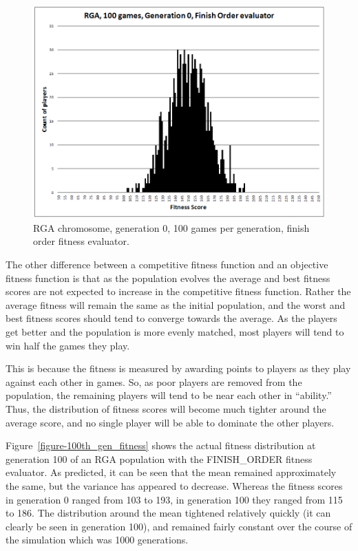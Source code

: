 \begin{figure}[htp]
\centerline{\includegraphics[width=1.0\columnwidth]{Figures/RGA_1024_G000_N100_FO.png}}
\caption[RGA Fitness Distribution, Initial Generation]{RGA chromosome,
generation 0, 100 games per generation, finish order fitness evaluator.}
\label{figure-RGA-G000-N100-FO-initial_fitness}
\end{figure}

The other difference between a competitive fitness function and an objective
fitness function is that as the population evolves the average and best fitness
scores are not expected to increase in the competitive fitness function. Rather
the average fitness will remain the same as the initial population, and the
worst and best fitness scores should tend to converge towards the average. As
the players get better and the population is more evenly matched, most players
will tend to win half the games they play.

This is because the fitness is measured by awarding points to players as they
play against each other in games. So, as poor players are removed from the
population, the remaining players will tend to be near each other in
``ability.'' Thus, the distribution of fitness scores will become much tighter
around the average score, and no single player will be able to dominate the
other players.

Figure~\ref{figure-100th_gen_fitness} shows the actual fitness distribution at
generation 100 of an RGA population with the FINISH\_ORDER fitness evaluator. As
predicted, it can be seen that the mean remained approximately the same, but the
variance has appeared to decrease. Whereas the fitness scores in generation 0
ranged from 103 to 193, in generation 100 they ranged from 115 to 186. The
distribution around the mean tightened relatively quickly (it can clearly be
seen in generation 100), and remained fairly constant over the course of the
simulation which was 1000 generations.

